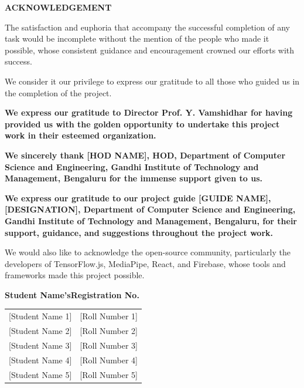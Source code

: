 \documentclass[12pt,letterpaper]{article}
\begin{document}
\newpage


\thispagestyle{fancy}

\begin{center}
{\fontsize{14}{17}\selectfont\textbf{ACKNOWLEDGEMENT}}
\end{center}

\vspace{1cm}

The satisfaction and euphoria that accompany the successful completion of any task would be incomplete without the mention of the people who made it possible, whose consistent guidance and encouragement crowned our efforts with success.

We consider it our privilege to express our gratitude to all those who guided us in the completion of the project.

\textbf{We express our gratitude to Director Prof. Y. Vamshidhar for having provided us with the golden opportunity to undertake this project work in their esteemed organization.}

\textbf{We sincerely thank [HOD NAME], HOD, Department of Computer Science and Engineering, Gandhi Institute of Technology and Management, Bengaluru for the immense support given to us.}

\textbf{We express our gratitude to our project guide [GUIDE NAME], [DESIGNATION], Department of Computer Science and Engineering, Gandhi Institute of Technology and Management, Bengaluru, for their support, guidance, and suggestions throughout the project work.}

We would also like to acknowledge the open-source community, particularly the developers of TensorFlow.js, MediaPipe, React, and Firebase, whose tools and frameworks made this project possible.

\vspace{2cm}

\noindent\textbf{Student Name's\hfill Registration No.}

\vspace{0.5cm}

\begin{table}[h]
\centering
\begin{tabular}{cc}
{[Student Name 1]} & [Roll Number 1] \\
{[Student Name 2]} & [Roll Number 2] \\
{[Student Name 3]} & [Roll Number 3] \\
{[Student Name 4]} & [Roll Number 4] \\
{[Student Name 5]} & [Roll Number 5] \\
\end{tabular}
\end{table}
\end{document}
